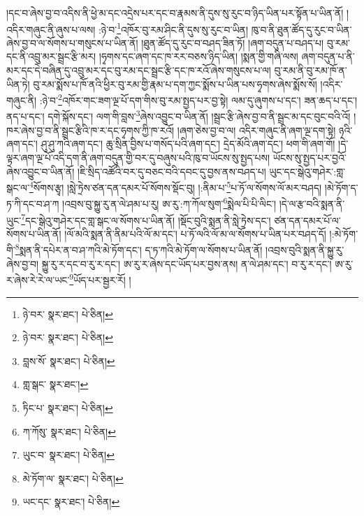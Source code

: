 །དང་བ་ཞེས་བྱ་བ་འདིས་ནི་ཕྱེ་མ་དང་འདྲེས་པར་དང་བ་རྣམས་ནི་དུས་སུ་རུང་བ་ཉིད་ཡིན་པར་སྟོན་པ་ཡིན་ནོ། །འདིར་གཞུང་ནི་ཞུས་པ་ལས། :ཉེ་བ་\footnote{ཉེ་བར་  སྣར་ཐང་།  པེ་ཅིན། }འཁོར་བུ་རམ་ཤིང་ནི་དུས་སུ་རུང་བ་ཡིན། ཁུ་བ་ནི་ཐུན་ཚོད་དུ་རུང་བ་ཡིན་ཞེས་བྱ་བ་ལ་སོགས་པ་གསུངས་པ་ཡིན་ནོ། །ཐུན་ཚོད་དུ་རུང་བ་བཤད་ཟིན་ཏོ། །ཞག་བདུན་པ་བཤད་པ། བུ་རམ་དང་ནི་འབྲུ་མར་སྦྲང་རྩི་མར། །ཧྭགས་དང་ཞག་དང་ཁ་རར་བཅས་ཉིད་ཡིན། །སྨན་གྱི་གཞི་ལས། ཞག་བདུན་པ་ནི་མར་དང་དེ་བཞིན་དུ་འབྲུ་མར་དང་བུ་རམ་དང་སྦྲང་རྩི་དང་ཁ་རའོ་ཞེས་གསུངས་པ་ལ། བུ་རམ་ནི་བུ་རམ་ཁོ་ན་ཡིན་ཏེ། བུ་རམ་སྨོས་པ་ཁོ་ནའི་ཕྱིར་བུ་རམ་གྱི་རྣམ་པ་དག་ཀྱང་སྨོས་པ་ཡིན་པས་ཧྭགས་ཞེས་སྨོས་སོ། །འདིར་གཞུང་ནི། :ཉེ་བ་\footnote{ཉེ་བར་  སྣར་ཐང་།  པེ་ཅིན། }འཁོར་གང་ཟག་ལྔ་པོ་དག་གིས་བུ་རམ་སྤྱད་པར་བྱ་སྟེ། ལམ་དུ་ཞུགས་པ་དང་། ཟན་ཆད་པ་དང་། ནད་པ་དང་། དགེ་སྐོས་དང་། ལག་གི་བླས་\footnote{བླས་སོ་  སྣར་ཐང་།  པེ་ཅིན། }ཞེས་འབྱུང་བ་ཡིན་ནོ། །སྦྲང་རྩི་ཞེས་བྱ་བ་ནི་སྦྲང་མ་དང་བུང་བའི་འོ། །ཁར་ཞེས་བྱ་བ་ནི་སྦྲང་རྩིའི་ཁ་ར་དང་ཧྭགས་ཀྱི་ཁ་རའོ། །ཞག་ཅེས་བྱ་བ་ལ། འདིར་གཞུང་ནི་ཞག་ལྔ་དག་སྟེ། ཉའི་ཞག་དང་། ཤུ་ཤུ་ཀའི་ཞག་དང་། ཆུ་སྲིན་བྱིས་པ་གསོད་པའི་ཞག་དང་། དྲེད་མོའི་ཞག་དང་། ཕག་གི་ཞག་གོ། །དེ་ལྟར་ཞག་ལྔ་པོ་འདི་དག་ནི་ཞག་བདུན་གྱི་བར་དུ་བཞུས་པའི་ཁུ་བ་ཡོངས་སུ་སྤྱད་པས། ཡོངས་སུ་སྤྱད་པར་བྱའོ་ཞེས་འབྱུང་བ་ཡིན་ནོ། །ཇི་སྲིད་འཚོའི་བར་དུ་བཅང་བའི་དབང་དུ་བྱས་ནས་བཤད་པ། ཡུང་དང་སྒེའུ་གཤེར་:གླ་སྒང་ལ་\footnote{གླ་སྒང་  སྣར་ཐང་། }སོགས་རྩྭ། །སླེ་ཏྲེས་ཙན་དན་དམར་པོ་སོགས་སྡོང་བུ། །:ནིམ་པ་\footnote{ཏིང་པ་  སྣར་ཐང་།  པེ་ཅིན། }པ་ཏོ་ལ་སོགས་ལོ་མར་བཤད། །མེ་ཏོག་ད་ཏ་ཀི་དང་བ་ཤ་ཀ །འབྲས་བུ་སྐྱུ་རུ་ན་ལེ་ཤམ་པ་རུ། ཨ་རུ་:ཀ་ཀོལ་སུག་\footnote{ཀ་ཀོསུ་  སྣར་ཐང་།  པེ་ཅིན། }སྨེལ་པི་པི་ལིང་། །དེ་ལ་རྩ་བའི་སྨན་ནི་ཡུང་\footnote{ཡུང་བ་  སྣར་ཐང་།  པེ་ཅིན། }དང་སྒེའུ་གཤེར་དང་གླ་སྒང་ལ་སོགས་པ་ཡིན་ནོ། །སྡོང་བུའི་སྨན་ནི་སླེ་ཏྲེས་དང་། ཙན་དན་དམར་པོ་ལ་སོགས་པ་ཡིན་ནོ། །ལོ་མའི་སྨན་ནི་ནིམ་པའི་ལོ་མ་དང་། པ་ཏོ་ལའི་ལོ་མ་ལ་སོགས་པ་ཡིན་པར་བཤད་དོ། །:མེ་ཏོག་གི་\footnote{མེ་ཏོག་ལ་  སྣར་ཐང་།  པེ་ཅིན། }སྨན་ནི་དཔེར་ན་བ་ཤ་ཀའི་མེ་ཏོག་དང་། ད་ཏ་ཀའི་མེ་ཏོག་ལ་སོགས་པ་ཡིན་ནོ། །འབྲས་བུའི་སྨན་ནི་སྐྱུ་རུ་ཞེས་བྱ་བ། སྐྱུ་རུ་ར་དང་བ་རུ་ར་དང་། ཨ་རུ་ར་ཞེས་དང་ཡོད་པར་བྱས་ནས། ན་ལེ་ཤམ་དང་། བ་རུ་ར་དང་། ཨ་རུ་ར་ཞེས་རེ་རེ་ལ་ཡང་\footnote{ཡང་དང་  སྣར་ཐང་།  པེ་ཅིན། }ཡོད་པར་སྦྱར་རོ། །
